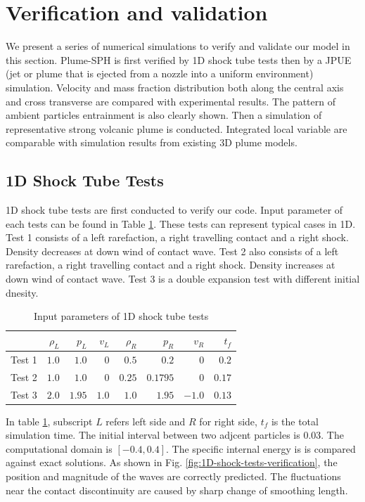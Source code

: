 \documentclass[gmd, manuscript]{copernicus}
\begin{document}
\section{Verification and validation} \label{sec:verification-validation}
We present a series of numerical simulations to verify and validate our model in this section. Plume-SPH is first verified by 1D shock tube tests then by a JPUE (jet or plume that is ejected from a nozzle into a uniform environment) simulation. Velocity and mass fraction distribution both along the central axis and cross transverse are compared with experimental results. The pattern of ambient particles entrainment is also clearly shown. Then a simulation of representative strong volcanic plume is conducted. Integrated local variable are comparable with simulation results from existing 3D plume models.
\subsection{1D Shock Tube Tests}
1D shock tube tests are first conducted to verify our code. Input parameter of each tests can be found in Table \ref{tab:1D-shock-input_parameters}. These tests can represent typical cases in 1D.
Test 1 consists of a left rarefaction, a right travelling contact and a right shock. Density decreases at down wind of contact wave.
Test 2 also consists of a left rarefaction, a right travelling contact and a right shock. Density increases at down wind of contact wave.
Test 3 is a double expansion test with different initial dnesity.

\begin{table}[htp]
\centering
      \caption{Input parameters of 1D shock tube tests}		
	  \begin{tabular}{lrrrrrrr}
	    \hline
	          & $\rho_L$ & $p_L$ &$v_L$ & $\rho_R$ & $p_R$ &$v_R$ & $t_f$\\
	    \hline
	    Test 1 & $1.0$ & $1.0$ &$0$ & $0.5$ & $0.2$ &$0$ & $0.2$\\
	    Test 2 & $1.0$ & $1.0$ &$0$ & $0.25$ & $0.1795$ &$0$ & $0.17$\\
	    	Test 3 & $2.0$ & $1.95$ &$1.0$ & $1.0$ & $1.95$ &$-1.0$ & $0.13$\\
	    \hline
	  \end{tabular}
	  \label{tab:1D-shock-input_parameters}
\end{table}

In  table \ref{tab:1D-shock-input_parameters},  subscript $L$ refers left side and $R$ for right side, $t_f$ is the total simulation time. The initial interval between two adjcent particles is 0.03. The computational domain is $[-0.4, 0.4]$. The specific internal energy is is compared against exact solutions. As shown in Fig. \ref{fig:1D-shock-tests-verification}, the position and magnitude of the waves are correctly predicted. The fluctuations near the contact discontinuity are caused by sharp change of smoothing length.
\end{document}
